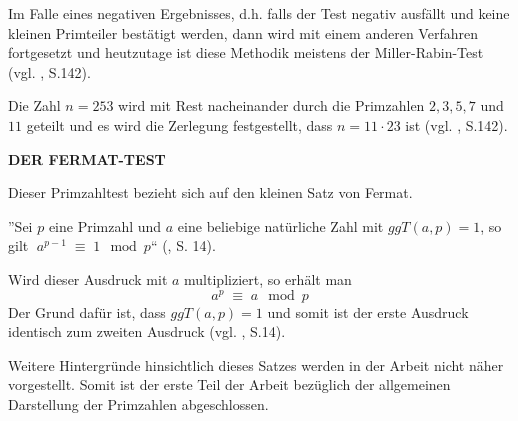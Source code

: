 Im Falle eines negativen Ergebnisses, d.h. falls der Test
negativ ausfällt und keine kleinen Primteiler bestätigt
werden, dann wird mit einem anderen Verfahren fortgesetzt
und heutzutage ist diese Methodik meistens der 
Miller-Rabin-Test (vgl. \cite{karpfingerkiechle}, S.142).

\begin{example}
Die Zahl $n = 253$ wird mit Rest nacheinander durch die
Primzahlen $2, 3, 5, 7$ und $11$ geteilt und es wird die
Zerlegung festgestellt, dass $n = 11\cdot 23$ ist
(vgl. \cite{karpfingerkiechle}, S.142).
\end{example}
\vspace{.3cm}


\textbf{DER FERMAT-TEST}

Dieser Primzahltest bezieht sich auf den kleinen Satz
von Fermat.
\begin{theorem}
''Sei $p$ eine Primzahl und $a$ eine beliebige natürliche
Zahl mit $ggT(a,p)=1$, so gilt $\; a^{p-1} \;\equiv\; 1\mod p$“
(\cite{sasgabor}, S. 14).
\end{theorem}

Wird dieser Ausdruck mit $a$ multipliziert, so erhält man
\[
 a^p \;\equiv\; a \mod p
\]
Der Grund dafür ist, dass $ggT(a,p)=1$ und somit ist der
erste Ausdruck identisch zum zweiten Ausdruck
(vgl. \cite{sasgabor}, S.14).

Weitere Hintergründe hinsichtlich dieses Satzes werden
in der Arbeit nicht näher vorgestellt.
Somit ist der erste Teil der Arbeit bezüglich der
allgemeinen Darstellung der Primzahlen abgeschlossen.
